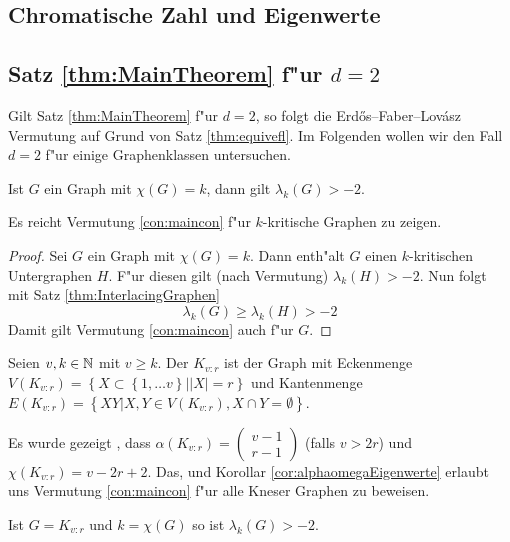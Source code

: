\subsection{Chromatische Zahl und Eigenwerte}

\subsection{Satz \ref{thm:MainTheorem} f"ur $d=2$}

Gilt Satz \ref{thm:MainTheorem} f"ur $d=2$, so folgt die Erd\H{o}s--Faber--Lov\'asz Vermutung auf Grund von Satz \ref{thm:equivefl}. Im Folgenden wollen wir den Fall $d=2$ f"ur einige Graphenklassen untersuchen. 

\begin{conjecture}
  Ist $G$ ein Graph mit $\chi(G) = k$, dann gilt $\lambda_{k}(G) > -2$. 
  \label{con:maincon}
\end{conjecture}

\begin{remark}
  Es reicht Vermutung \ref{con:maincon} f"ur $k$-kritische Graphen zu zeigen. 
\end{remark}

\begin{proof}
  Sei $G$ ein Graph mit $\chi(G) = k$. Dann enth"alt $G$ einen $k$-kritischen Untergraphen $H$. F"ur diesen gilt (nach Vermutung) $\lambda_{k}(H) > -2$. Nun folgt mit Satz \ref{thm:InterlacingGraphen}
  \begin{equation*}
    \lambda_{k}(G) \geq \lambda_{k}(H) > -2
  \end{equation*}
  Damit gilt Vermutung \ref{con:maincon} auch f"ur $G$.
\end{proof}

Seien $v,k\in {\mathbb{N}}$ mit $v \geq k$. Der  $K_{v:r}$ ist der Graph mit Eckenmenge $V(K_{v:r}) = \left\{ X \subset \left\{ 1,\dots v \right\} | |X| = r \right\}$ und Kantenmenge $E(K_{v:r}) = \left\{ XY| X,Y \in V(K_{v:r}), X \cap Y = \emptyset \right\}$. 

Es wurde gezeigt , dass $\alpha(K_{v:r}) =\begin{pmatrix}
   v-1 \\ r-1
 \end{pmatrix}$ (falls $v >2r$) und $\chi(K_{v:r}) = v-2r+2$. Das, und  Korollar \ref{cor:alphaomegaEigenwerte} erlaubt uns Vermutung \ref{con:maincon} f"ur alle Kneser Graphen zu beweisen. 

 \begin{proposition}
   Ist $G=K_{v:r}$ und $k= \chi(G)$ so ist $\lambda_{k}(G) > -2$. 
 \end{proposition}

